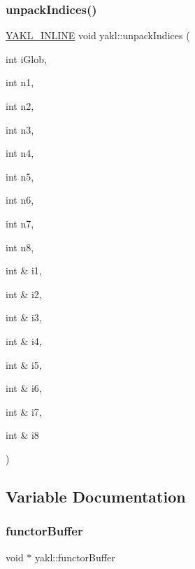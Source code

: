\subsubsection{\texorpdfstring{unpack\+Indices()}{unpackIndices()}\hspace{0.1cm}{\footnotesize\ttfamily [7/7]}}
{\footnotesize\ttfamily \hyperlink{YAKL_8h_aa0dd629ffce6d564b19e9313fb91a5ad}{Y\+A\+K\+L\+\_\+\+I\+N\+L\+I\+NE} void yakl\+::unpack\+Indices (\begin{DoxyParamCaption}\item[{int}]{i\+Glob,  }\item[{int}]{n1,  }\item[{int}]{n2,  }\item[{int}]{n3,  }\item[{int}]{n4,  }\item[{int}]{n5,  }\item[{int}]{n6,  }\item[{int}]{n7,  }\item[{int}]{n8,  }\item[{int \&}]{i1,  }\item[{int \&}]{i2,  }\item[{int \&}]{i3,  }\item[{int \&}]{i4,  }\item[{int \&}]{i5,  }\item[{int \&}]{i6,  }\item[{int \&}]{i7,  }\item[{int \&}]{i8 }\end{DoxyParamCaption})}



\subsection{Variable Documentation}
\mbox{\label{namespaceyakl_a1494e7173b6c6f4c68eb55b6f70a521f}} 
\subsubsection{\texorpdfstring{functor\+Buffer}{functorBuffer}}
{\footnotesize\ttfamily void $\ast$ yakl\+::functor\+Buffer}

\mbox{\label{namespaceyakl_a01bfd5e27f299747a137fd7f60c2bc17}} 
